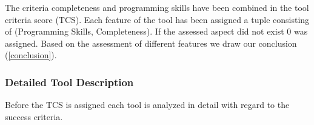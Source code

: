 The criteria completeness and programming skills have been combined in the tool criteria score  (TCS). Each feature of the tool has been assigned a tuple consisting of  (Programming Skills, Completeness). If the assessed aspect did not exist 0 was assigned.
Based on the assessment of different features  we draw our conclusion  (\ref{conclusion}).



\subsubsection{Detailed Tool Description}\label{tool:tools}
Before the TCS is assigned each tool is analyzed in detail with regard to the success criteria. \\

